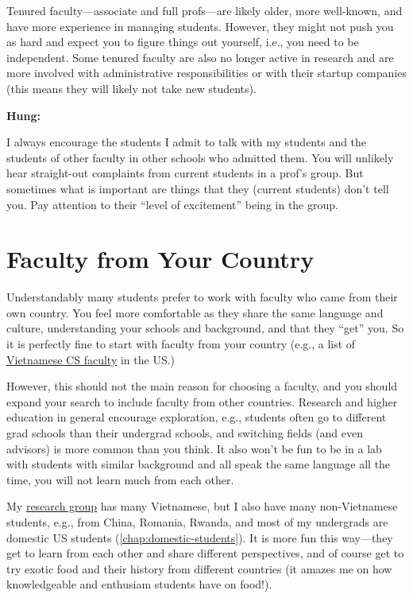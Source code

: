 \documentclass[oneside,11pt]{book}
\newenvironment{commentbox}[1][]{
  \small
  \begin{marker}[\faChessPawn{}]
    {\textbf{#1}}
  }{
  \end{marker}
}
\begin{document}
Tenured faculty---associate and full profs---are likely older, more well-known, and have more experience in managing students.  However, they might not push you as hard and expect you to figure things out yourself, i.e., you need to be independent.  Some tenured faculty are also no longer active in research and are more involved with administrative responsibilities or with their startup companies (this means they will likely not take new students).


\begin{commentbox}[Hung:]
  I always encourage the students I admit to talk with my students and the students of other faculty in other schools who admitted them. You will unlikely hear straight-out complaints from current students in a prof's group. But sometimes what is important are things that they (current students) don't tell you. Pay attention to their ``level of excitement'' being in the group.
\end{commentbox}
\section{Faculty from Your Country}\label{sec:prioritizing-faculty}

Understandably many students prefer to work with faculty who came from their own country.
You feel more comfortable as they share the same language and culture, understanding your schools and background, and that they ``get'' you.
So it is perfectly fine to start with faculty from your country (e.g., a list of \href{https://roars.dev/phd-cs-us/viet-cs-profs-us}{Vietnamese CS faculty} in the US.)

However, this should not the main reason for choosing a faculty, and you should expand your search to include faculty from other countries. Research and higher education in general encourage exploration, e.g., students often go to different grad schools than their undergrad schools, and switching fields (and even advisors) is more common than you think.  It also won't be fun to be in a lab with students with similar background and all speak the same language all the time, you will not learn much from each other.

\begin{commentbox}
 My \href{https://roars.dev}{research group} has many Vietnamese, but I also have many non-Vietnamese students, e.g., from China, Romania, Rwanda, and most of my undergrads are domestic US students (\autoref{chap:domestic-students}). It is more fun this way---they get to learn from each other and share different perspectives, and of course get to try exotic food and their history from different countries (it amazes me on how knowledgeable and enthusiam students have on food!).
\end{commentbox}
\end{document}
